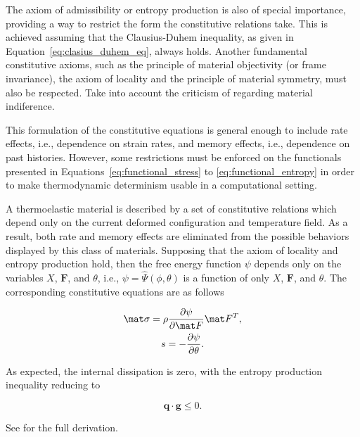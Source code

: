 The axiom of admissibility or entropy production is also of special importance, providing a way to restrict the form the constitutive relations take.
This is achieved assuming that the Clausius-Duhem inequality, as given in Equation~\eqref{eq:clasius_duhem_eq}, always holds.
Another fundamental constitutive axioms, such as the principle of material objectivity (or frame invariance), the axiom of locality and the principle of material symmetry, must also be respected.
\colorbox{BrickRed}{Take into account the criticism of \cite{edelenMaterialIndifferencePrinciple1973} regarding material indiference.}

This formulation of the constitutive equations is general enough to include rate effects, i.e., dependence on strain rates, and memory effects, i.e., dependence on past histories.
However, some restrictions must be enforced on the functionals presented in Equations~\eqref{eq:functional_stress} to \eqref{eq:functional_entropy} in order to make thermodynamic determinism usable in a computational setting.

A thermoelastic material is described by a set of constitutive relations which depend only on the current deformed configuration and temperature field.
As a result, both rate and memory effects are eliminated from the possible behaviors displayed by this class of materials.
Supposing that the axiom of locality and entropy production hold, then the free energy function $\psi$ depends only on the variables $X$, $\mathbf F$, and $\theta$, i.e., $\psi = \hat \Psi(\phi, \theta)$ is a function of only $X$, $\mathbf F$, and $\theta$.
The corresponding constitutive equations are as follows
\begin{highlight}[innertopmargin=-5pt]
    \begin{gather}
    		\label{eq:constitutive_equation_stress_thermoelasticity}
        \mat \sigma = \rho \frac{\partial \psi}{\partial \mat F}\mat F^T, \\
        \label{eq:constitutive_equation_entropy_thermoelasticity}
        s = -\frac{\partial \psi}{\partial \theta}.
    \end{gather}
\end{highlight}
As expected, the internal dissipation is zero, with the entropy production inequality reducing to
\begin{highlight}
  \begin{equation}
    \mathbf q\cdot \mathbf g \leq 0.
  \end{equation}
\end{highlight}
See \cite{marsden1994mathematical} for the full derivation.

